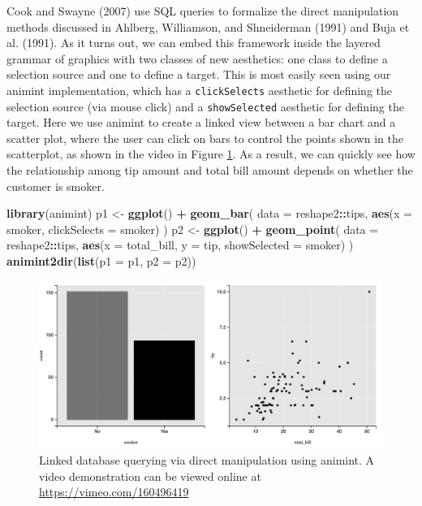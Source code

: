 \documentclass[12pt,]{article}
\newenvironment{Shaded}{\begin{snugshade}}{\end{snugshade}}
\newcommand{\KeywordTok}[1]{\textcolor[rgb]{0.13,0.29,0.53}{\textbf{#1}}}
\newcommand{\DataTypeTok}[1]{\textcolor[rgb]{0.13,0.29,0.53}{#1}}
\newcommand{\StringTok}[1]{\textcolor[rgb]{0.31,0.60,0.02}{#1}}
\newcommand{\OperatorTok}[1]{\textcolor[rgb]{0.81,0.36,0.00}{\textbf{#1}}}
\newcommand{\NormalTok}[1]{#1}
\theoremstyle{definition}
\theoremstyle{definition}
\theoremstyle{remark}
\begin{document}
Cook and Swayne (2007) use SQL queries to formalize the direct
manipulation methods discussed in Ahlberg, Williamson, and Shneiderman
(1991) and Buja et al. (1991). As it turns out, we can embed this
framework inside the layered grammar of graphics with two classes of new
aesthetics: one class to define a selection source and one to define a
target. This is most easily seen using our animint implementation, which
has a \texttt{clickSelects} aesthetic for defining the selection source
(via mouse click) and a \texttt{showSelected} aesthetic for defining the
target. Here we use animint to create a linked view between a bar chart
and a scatter plot, where the user can click on bars to control the
points shown in the scatterplot, as shown in the video in Figure
\ref{fig:tips}. As a result, we can quickly see how the relationship
among tip amount and total bill amount depends on whether the customer
is smoker.

\begin{Shaded}
\begin{Highlighting}[]
\KeywordTok{library}\NormalTok{(animint)}
\NormalTok{p1 <-}\StringTok{ }\KeywordTok{ggplot}\NormalTok{() }\OperatorTok{+}\StringTok{ }\KeywordTok{geom_bar}\NormalTok{(}
  \DataTypeTok{data =}\NormalTok{ reshape2}\OperatorTok{::}\NormalTok{tips, }
  \KeywordTok{aes}\NormalTok{(}\DataTypeTok{x =}\NormalTok{ smoker, }\DataTypeTok{clickSelects =}\NormalTok{ smoker)}
\NormalTok{)}
\NormalTok{p2 <-}\StringTok{ }\KeywordTok{ggplot}\NormalTok{() }\OperatorTok{+}\StringTok{ }\KeywordTok{geom_point}\NormalTok{(}
  \DataTypeTok{data =}\NormalTok{ reshape2}\OperatorTok{::}\NormalTok{tips, }
  \KeywordTok{aes}\NormalTok{(}\DataTypeTok{x =}\NormalTok{ total_bill, }\DataTypeTok{y =}\NormalTok{ tip, }
      \DataTypeTok{showSelected =}\NormalTok{ smoker)}
\NormalTok{)}
\KeywordTok{animint2dir}\NormalTok{(}\KeywordTok{list}\NormalTok{(}\DataTypeTok{p1 =}\NormalTok{ p1, }\DataTypeTok{p2 =}\NormalTok{ p2))}
\end{Highlighting}
\end{Shaded}

\begin{figure}
\centering
\includegraphics{images/tips}
\caption{\label{fig:tips}Linked database querying via direct manipulation
using animint. A video demonstration can be viewed online at
\url{https://vimeo.com/160496419}}
\end{figure}
\end{document}
